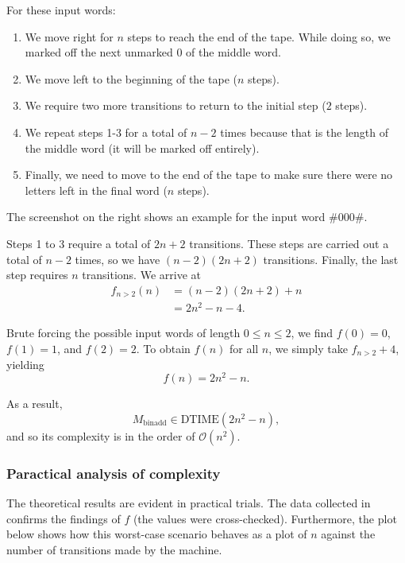 For these input words:

\begin{enumerate}
    \item We move right for $n$ steps to reach the end of the tape. While doing so, we marked off the next unmarked $0$ of the middle word. 
    \item We move left to the beginning of the tape ($n$ steps).
    \item We require two more transitions to return to the initial step ($2$ steps).
    \item We repeat steps 1-3 for a total of $n-2$ times because that is the length of the middle word (it will be marked off entirely).
    \item Finally, we need to move to the end of the tape to make sure there were no letters left in the final word ($n$ steps).
\end{enumerate}

The screenshot on the right shows an example for the input word $\#000\#$.

Steps 1 to 3 require a total of $2n+2$ transitions. These steps are carried out a total of $n-2$ times, so we have $(n-2)(2n+2)$ transitions. Finally, the last step requires $n$ transitions. We arrive at
\begin{align*}
    f_{n>2}(n)
    &= (n-2)(2n+2) + n \\
    &= 2n^2 - n - 4.
\end{align*}

Brute forcing the possible input words of length $0 \leq n \leq 2$, we find $f(0)=0$, $f(1)=1$, and $f(2)=2$. To obtain $f(n)$ for all $n$, we simply take $f_{n>2}+4$, yielding
$$ f(n) = 2n^2 - n. $$

As a result,
$$ M_\text{binadd} \in \text{DTIME}(2n^2-n), $$
and so its complexity is in the order of $\mathcal{O}(n^2)$.

\subsubsection{Paractical analysis of complexity}

The theoretical results are evident in practical trials. The data collected in  confirms the findings of $f$ (the values were cross-checked). Furthermore, the plot below shows how this worst-case scenario behaves as a plot of $n$ against the number of transitions made by the machine. 

